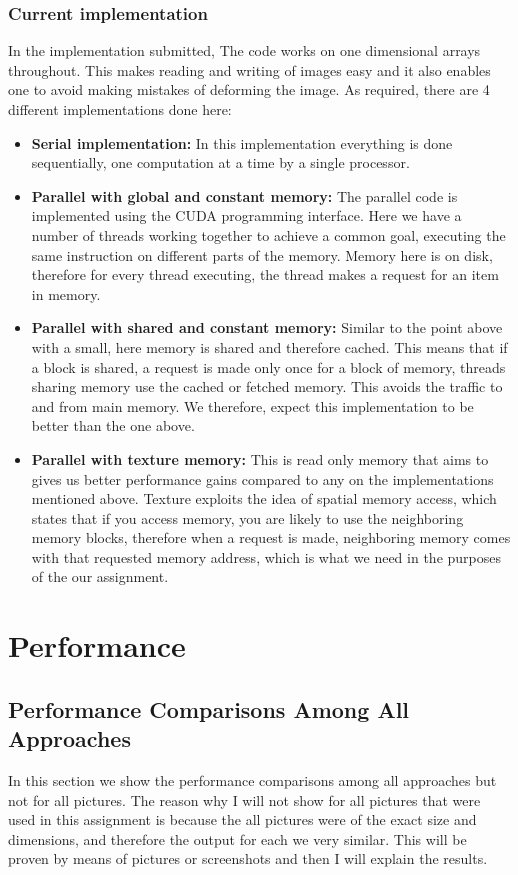  \subsubsection*{Current implementation}
 In the implementation submitted, The code works on one dimensional arrays throughout. This makes reading and writing of images easy and it also enables one to avoid making mistakes of deforming the image. As required, there are 4 different implementations done here:
 \begin{itemize}
 	\item \textbf{Serial implementation:} In this implementation everything is done sequentially, one computation at a time by a single processor.
 	\item \textbf{Parallel with global and constant memory:} The parallel code is implemented using the CUDA programming interface. Here we have a number of threads working together to achieve a common goal, executing the same instruction on different parts of the memory. Memory here is on disk, therefore for every thread executing, the thread makes a request for an item in memory.
 	\item \textbf{Parallel with shared and constant memory:}  Similar to the point above with a small, here memory is shared and therefore cached. This means that if a block is shared, a request is made only once for a block of memory, threads sharing memory use the cached or fetched memory. This avoids the traffic to and from main memory. We therefore, expect this implementation to be better than the one above.
 	\item \textbf{Parallel with texture memory:} This is read only memory that aims to gives us better performance gains compared to any on the implementations mentioned above. Texture exploits the idea of spatial memory access, which states that if you access memory, you are likely to use the neighboring memory blocks, therefore when a request is made, neighboring memory comes with that requested memory address, which is what we need in the purposes of the our assignment.
 \end{itemize}

\section*{Performance}
\subsection*{Performance Comparisons Among All Approaches}
In this section we show the performance comparisons among all approaches but not for all pictures. The reason why I will not show for all pictures that were used in this assignment is because the all pictures were of the exact size and dimensions, and therefore the output for each we very similar. This will be proven by means of pictures or screenshots and then I will explain the results.


 
 

